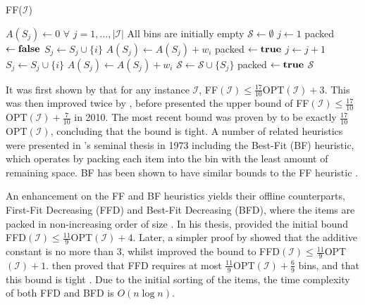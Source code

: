 \documentclass[a4paper,11pt]{article}
\begin{document}
\begin{algorithm}[h]	
\caption{FF($\mathcal{I}$)}
\label{alg:ff}
\small
\begin{algorithmic}[1]
	\State $A(S_j) \gets 0$ $\forall$ $j=1,\dotsc,|\mathcal{I}|$ \Comment All bins are initially empty
	\State $\mathcal{S} \gets \emptyset$
		\State $j \gets 1$
		\State packed $\gets \textbf{false}$
					\State $S_j \gets S_j \cup \{i\}$
					\State $A(S_j) \gets A(S_j) + w_i$
					\State packed $\gets \textbf{true}$
				\Else \hspace{0.2mm} $j \gets j + 1$
				\EndIf
				\State $S_j \gets S_j \cup \{i\}$
				\State $A(S_j) \gets A(S_j) + w_i$
				\State $\mathcal{S} \gets \mathcal{S} \cup \{S_j\}$
				\State packed $\gets \textbf{true}$
			\EndIf
		\EndWhile
	\EndFor	
	\Return $\mathcal{S}$	
\end{algorithmic}	
\end{algorithm}

\noindent It was first shown by \citet{ullman1971} that for any instance $\mathcal{I}$, FF$(\mathcal{I}) \leq \frac{17}{10}$OPT$(\mathcal{I}) + 3$. This was then improved twice by \citet{garey1972, garey1976}, before \citeauthor{xia2010} presented the upper bound of FF$(\mathcal{I}) \leq \frac{17}{10}$OPT$(\mathcal{I}) + \frac{7}{10}$ in 2010. The most recent bound was proven by \citet{dosa2013ff} to be exactly $\frac{17}{10}$OPT$(\mathcal{I})$, concluding that the bound is tight. A number of related heuristics were presented in \citeauthor{johnson1973}'s seminal thesis in 1973 including the Best-Fit (BF) heuristic, which operates by packing each item into the bin with the least amount of remaining space. BF has been shown to have similar bounds to the FF heuristic \citep{dosa2014}.

An enhancement on the FF and BF heuristics yields their offline counterparts, First-Fit Decreasing (FFD) and Best-Fit Decreasing (BFD), where the items are packed in non-increasing order of size \citep{johnson1974w}. In his thesis, \citet{johnson1973} provided the initial bound FFD$(\mathcal{I}) \leq \frac{11}{9}$OPT$(\mathcal{I}) + 4$. Later, a simpler proof by \citet{baker1985} showed that the additive constant is no more than 3, whilst \citet{yue1991} improved the bound to FFD$(\mathcal{I}) \leq \frac{11}{9}$OPT$(\mathcal{I}) + 1$. \citet{dosa2007} then proved that FFD requires at most $\frac{11}{9}$OPT$(\mathcal{I}) + \frac{6}{9}$ bins, and that this bound is tight \citep{dosa2013ffd}. Due to the initial sorting of the items, the time complexity of both FFD and BFD is $O(n \log n)$.
\end{document}
